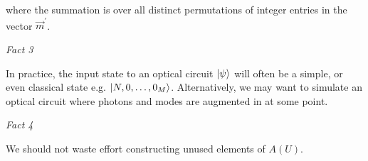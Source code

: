 \documentclass[aps,pra,twocolumn,showpacs,superscriptaddress,floatfix,10pt]{revtex4}
\begin{document}
where the summation is over all distinct permutations of integer entries in the vector $\vec{m}^\prime$.
\begin{center}\textit{Fact 3} \end{center}
\newline
\newline
\newline
In practice, the input state to an optical circuit $\ket{\psi}$ will often be a simple, or even classical state e.g. $\ket{N,0,\dots,0_M}$. Alternatively, we may want to simulate an optical circuit where photons and modes are augmented in at some point. 
\begin{center}\textit{Fact 4} \end{center}
\newline
\newline
\newline
We should not waste effort constructing unused elements of $A(U)$.
\end{document}

